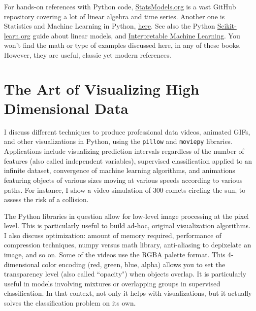 \documentclass[oneside,10pt]{book}
\newcommand\Chapter[2]{
  \chapter[#1]{#1\\[2ex]\Large\itshape#2}
}
\renewcommand{\arraystretch}{1.4} %
\begin{document}
For hands-on references with Python code, \href{https://www.statsmodels.org/stable/user-guide.html}{StatsModels.org} is a vast GitHub repository  covering a lot of linear algebra and time series. Another one is Statistics and Machine Learning in Python, \href{https://duchesnay.github.io/pystatsml/}{here}. See also the Python \href{https://scikit-learn.org/0.15/modules/linear_model.html}{Scikit-learn.org} guide about linear models,
and \href{https://christophm.github.io/interpretable-ml-book/limo.html}{Interpretable Machine Learning}. You won't find the math or type of examples discussed here, in any of these books. However, they are useful, classic yet modern references.





\renewcommand{\arraystretch}{1.4} %

\Chapter{The Art of Visualizing High Dimensional Data}{}\label{chapvisu}


I discuss different techniques  to produce professional data videos, animated GIFs, and other visualizations in Python, 
using the \texttt{pillow} and \texttt{moviepy} libraries. Applications include visualizing prediction intervals regardless of the number of features (also called independent variables), supervised classification applied to an infinite dataset, convergence of machine learning algorithms, and animations featuring objects of various sizes moving at various speeds according to various paths. For instance, I show a video simulation of 300 comets circling the sun, to assess the risk of a collision. 

The Python libraries in question 
allow for low-level image processing at the pixel level. This is particularly useful to build ad-hoc, original visualization algorithms.  I also discuss  optimization: 
amount of memory required, performance of compression techniques, numpy versus math library, anti-aliasing to depixelate an image, and so on. Some of the videos use the RGBA palette format. 
This 4-dimensional color encoding (red, green, blue, alpha) allows you to set the transparency level (also called ``opacity") when objects overlap. It is particularly useful in models involving mixtures or overlapping groups in supervised classification. In that context, not only it helps with visualizations, but it actually solves the classification problem on its own.
\end{document}
